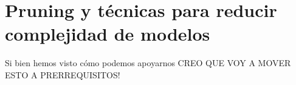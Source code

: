 {\begin{comment}
Aplicado al problema de la predicción de la actividad humana, Li\cite{Li2019} \todo{de nuevo... pocas referencias a estudios que usen LSTMs y rnn y grus} usa redes con varias capas LSTM bidireccionales usando los datos obtenidos por un acelerómetro y un radar con un dispositivo de captura en la muñeca mientras consigue resultados comparables a las mejores técnicas de clasificación existentes.

Para la predicción \textit{many-to-many} de señales temporales, Cho \cite{cho2014} introduce el concepto de Codficador-Decodificador alpicado a la traducción automática. Esta técnica usa un espacio de representación intermedio, una capa de conversión del espacio original al intermedio y finalmente otra de interpretación desde el espacio intermedio al final. Similar a como funcionan los autoencoders o los embeddings.

\end{comment}

\section{Pruning y técnicas para reducir complejidad de modelos}\label{sec:arte:optimizacion}

Si bien hemos visto cómo podemos apoyarnos CREO QUE VOY A MOVER ESTO A PRERREQUISITOS!


\begin{comment}
A pesar de la creciente capacidad de cálculo de los dispositivos vestibles, será necesario optimizar el rendimiento del modelo con el fin de conseguir la mayor capacidad de predicción por Hz del sistema. Para ello dispondremos de dos técnicas: \textit{Pruning} y \textit{Cuantificación}.

\subsection{Pruning}
Un modelo de redes neuronales se puede entender como una matriz de pesos que indican la contribción de cada nodo o neurona al resultado final. Es normal que en esa red haya nodos que aporten más información que otros. Este efecto no es necesariamente negativo, la regularización o normalización L1 busca precisamente este efecto para reducir el sobreajuste de la red a los datos de entrenamiento.

Esta diferencia de aportación nos permite realizar una compresión del modelo. Si aceptamos sufrir unas ciertas pérdidas en la capacidad predictiva del mismo, podemos eliminar los nodos de menor peso reduciendo el tamaño de la red y su consumo de memoria. Esta reducción permite además acelerar el modelo y adaptarlo al uso en sistemas embebidos.\todo{Buscar bibliografía formal para: https://www.machinecurve.com/index.php/2020/09/23/tensorflow-model-optimization-an-introduction-to-pruning/}


\end{comment}}
